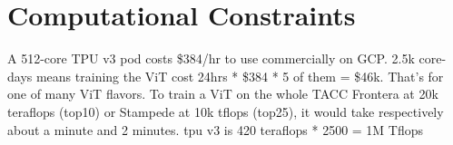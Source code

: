 \section{Computational Constraints}

A 512-core TPU v3 pod costs \$384/hr to use commercially on GCP. 
2.5k core-days means training the ViT cost 24hrs * \$384 * 5 of them = \$46k. 
That's for one of many ViT flavors.
To train a ViT on the whole TACC Frontera at 20k teraflops (top10) or 
Stampede at 10k tflops (top25), it would take respectively about a minute and 2 minutes.
tpu v3 is 420 teraflops * 2500 = 1M Tflops








